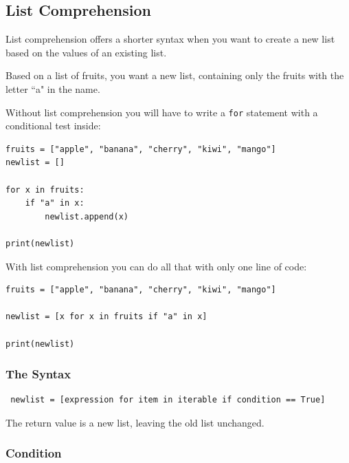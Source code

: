 \documentclass[12pt,a4paper]{article}
\newcommand{\lcode}[1]{%
	\lstinline{#1}%
}
\begin{document}
\subsection{List Comprehension}

List comprehension offers a shorter syntax when you want to create a new list
based on the values of an existing list.

\begin{ebox}
Based on a list of fruits, you want a new list, containing only the fruits with
the letter ``a" in the name.

Without list comprehension you will have to write a \lcode{for} statement with a
conditional test inside:
	\begin{lstlisting}
fruits = ["apple", "banana", "cherry", "kiwi", "mango"]
newlist = []

for x in fruits:
    if "a" in x:
        newlist.append(x)

print(newlist)
	\end{lstlisting}
\tcblower
	\begin{vercode}
	\end{vercode}
\end{ebox}

With list comprehension you can do all that with only one line of code:

\begin{ebox}
	\begin{lstlisting}
fruits = ["apple", "banana", "cherry", "kiwi", "mango"]

newlist = [x for x in fruits if "a" in x]

print(newlist)
	\end{lstlisting}
\tcblower
	\begin{vercode}
	\end{vercode}
\end{ebox}
\subsubsection{The Syntax}

\begin{lstlisting}
 newlist = [expression for item in iterable if condition == True]
\end{lstlisting}

The return value is a new list, leaving the old list unchanged.
\subsubsection{Condition}
\end{document}
